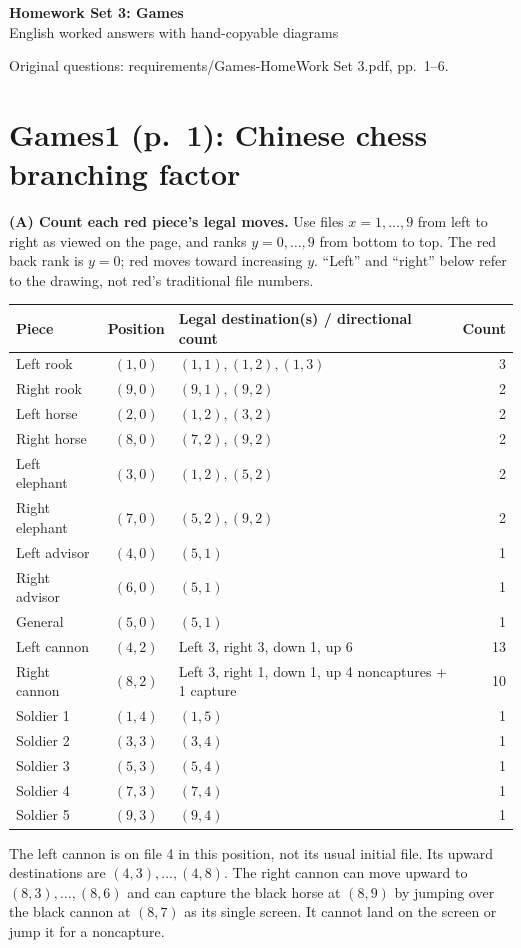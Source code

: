 \documentclass[11pt,a4paper]{article}
\newcommand{\question}[2]{\section*{#1: #2}}
\begin{document}
\begin{center}{\Large\bfseries Homework Set 3: Games}\\[4pt]English worked answers with hand-copyable diagrams\end{center}
\small Original questions: requirements/Games-HomeWork Set 3.pdf, pp.\ 1--6.\normalsize

\question{Games1 (p.\ 1)}{Chinese chess branching factor}
\textbf{(A) Count each red piece's legal moves.} Use files $x=1,\ldots,9$ from left to right as viewed on the page, and ranks $y=0,\ldots,9$ from bottom to top. The red back rank is $y=0$; red moves toward increasing $y$. ``Left'' and ``right'' below refer to the drawing, not red's traditional file numbers.
\begin{center}\small\begin{tabular}{l|c|p{7.9cm}|r}\toprule
Piece&Position&Legal destination(s) / directional count&Count\\\midrule
Left rook&$(1,0)$&$(1,1),(1,2),(1,3)$&3\\
Right rook&$(9,0)$&$(9,1),(9,2)$&2\\
Left horse&$(2,0)$&$(1,2),(3,2)$&2\\
Right horse&$(8,0)$&$(7,2),(9,2)$&2\\
Left elephant&$(3,0)$&$(1,2),(5,2)$&2\\
Right elephant&$(7,0)$&$(5,2),(9,2)$&2\\
Left advisor&$(4,0)$&$(5,1)$&1\\
Right advisor&$(6,0)$&$(5,1)$&1\\
General&$(5,0)$&$(5,1)$&1\\
Left cannon&$(4,2)$&Left 3, right 3, down 1, up 6&13\\
Right cannon&$(8,2)$&Left 3, right 1, down 1, up 4 noncaptures + 1 capture&10\\
Soldier 1&$(1,4)$&$(1,5)$&1\\
Soldier 2&$(3,3)$&$(3,4)$&1\\
Soldier 3&$(5,3)$&$(5,4)$&1\\
Soldier 4&$(7,3)$&$(7,4)$&1\\
Soldier 5&$(9,3)$&$(9,4)$&1\\\bottomrule\end{tabular}\normalsize\end{center}
The left cannon is on file 4 in this position, not its usual initial file. Its upward destinations are $(4,3),\ldots,(4,8)$. The right cannon can move upward to $(8,3),\ldots,(8,6)$ and can capture the black horse at $(8,9)$ by jumping over the black cannon at $(8,7)$ as its single screen. It cannot land on the screen or jump it for a noncapture.
\end{document}

